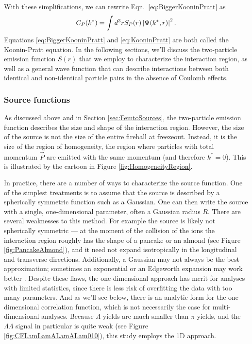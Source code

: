 
With these simplifications, we can rewrite Eqn.\ \ref{eq:BiggerKooninPratt} as 
\begin{equation}
\label{eq:KooninPratt}
C_P(k^*) =  \int d^3r S_{P} (r) \left\lvert\Psi(k^*,r)\right\rvert^2.
\end{equation}
Equations \ref{eq:BiggerKooninPratt} and \ref{eq:KooninPratt} are both called the Koonin-Pratt equation. 
In the following sections, we'll discuss the two-particle emission function $S(r)$ that we employ to characterize the interaction region, as well as a general wave function that can describe interactions between both identical and non-identical particle pairs in the absence of Coulomb effects.

\subsubsection{Source functions}
\label{sec:SourceFunctions}

As discussed above and in Section \ref{sec:FemtoSources}, the two-particle emission function describes the size and shape of the interaction region.
However, the size of the source is not the size of the entire fireball at freezeout.
Instead, it is the size of the region of homogeneity, the region where particles with total momentum $\vec{P}$ are emitted with the same momentum (and therefore $k^* = 0$).
This is illustrated by the cartoon in Figure \ref{fig:HomogeneityRegion}.

In practice, there are a number of ways to characterize the source function.
One of the simplest treatments is to assume that the source is described by a spherically symmetric function such as a Gaussian.
One can then write the source with a single, one-dimensional parameter, often a Gaussian radius $R$.
There are several weaknesses to this method.
For example the source is likely not spherically symmetric --- at the moment of the collision of the ions the interaction region roughly has the shape of a pancake or an almond (see Figure \ref{fig:PancakeAlmond}), and it need not expand isotropically in the longitudinal and transverse directions.
Additionally, a Gaussian may not always be the best approximation; sometimes an exponential or an Edgeworth expansion may work better \cite{Abelev:2014pja}.
Despite these flaws, the one-dimensional approach has merit for analyses with limited statistics, since there is less risk of overfitting the data with too many parameters.
And as we'll see below, there is an analytic form for the one-dimensional correlation function, which is not necessarily the case for multi-dimensional analyses.
Because $\Lambda$ yields are much smaller than $\pi$ yields, and the $\Lambda\Lambda$ signal in particular is quite weak (see Figure \ref{fig:CFLamLamALamALam010}), this study employs the 1D approach.

